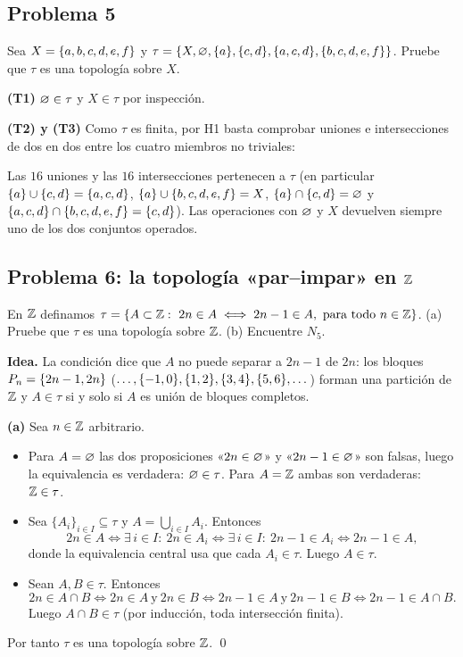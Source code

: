 \subsection{Problema 5}
\begin{enunciado}
Sea $X=\{a,b,c,d,e,f\}$ y $\tau=\{X,\varnothing,\{a\},\{c,d\},\{a,c,d\},\{b,c,d,e,f\}\}$. Pruebe que $\tau$ es una topología
sobre $X$.
\end{enunciado}
\textbf{(T1)} $\varnothing\in\tau$ y $X\in\tau$ por inspección.

\textbf{(T2) y (T3)} Como $\tau$ es finita, por H1 basta comprobar uniones e intersecciones de dos en dos entre los
cuatro miembros no triviales:
\begin{center}{\small\renewcommand{\arraystretch}{1.15}}\end{center}
\begin{center}{\small\renewcommand{\arraystretch}{1.15}}\end{center}
Las $16$ uniones y las $16$ intersecciones pertenecen a $\tau$ (en particular $\{a\}\cup\{c,d\}=\{a,c,d\}$,
$\{a\}\cup\{b,c,d,e,f\}=X$, $\{a\}\cap\{c,d\}=\varnothing$ y $\{a,c,d\}\cap\{b,c,d,e,f\}=\{c,d\}$). Las operaciones con
$\varnothing$ y $X$ devuelven siempre uno de los dos conjuntos operados.

\subsection{Problema 6: la topología «par--impar» en \texorpdfstring{$\mathbb{Z}$}{Z}}
\begin{enunciado}
En $\mathbb{Z}$ definamos $\tau=\{A\subset\Z:\ 2n\in A\iff 2n-1\in A,\ \text{para todo } n\in\Z\}$.
(a) Pruebe que $\tau$ es una topología sobre $\mathbb{Z}$. (b) Encuentre $N_5$.
\end{enunciado}
\textbf{Idea.} La condición dice que $A$ no puede separar a $2n-1$ de $2n$: los bloques
$P_n=\{2n-1,2n\}$ ($\dots,\{-1,0\},\{1,2\},\{3,4\},\{5,6\},\dots$) forman una partición de $\mathbb{Z}$ y
$A\in\tau$ si y solo si $A$ es unión de bloques completos.

\textbf{(a)} Sea $n\in\mathbb{Z}$ arbitrario.
\begin{itemize}
\item[(T1)] Para $A=\varnothing$ las dos proposiciones «$2n\in\varnothing$» y «$2n-1\in\varnothing$» son falsas, luego la equivalencia es
verdadera: $\varnothing\in\tau$. Para $A=\mathbb{Z}$ ambas son verdaderas: $\mathbb{Z}\in\tau$.
\item[(T2)] Sea $\{A_i\}_{i\in I}\subseteq\tau$ y $A=\bigcup_{i\in I}A_i$. Entonces
\[
2n\in A\iff \exists\, i\in I:\ 2n\in A_i\iff \exists\, i\in I:\ 2n-1\in A_i\iff 2n-1\in A,
\]
donde la equivalencia central usa que cada $A_i\in\tau$. Luego $A\in\tau$.
\item[(T3)] Sean $A,B\in\tau$. Entonces
\[
2n\in A\cap B\iff 2n\in A\ \text{y}\ 2n\in B\iff 2n-1\in A\ \text{y}\ 2n-1\in B\iff 2n-1\in A\cap B .
\]
Luego $A\cap B\in\tau$ (por inducción, toda intersección finita).
\end{itemize}
Por tanto $\tau$ es una topología sobre $\mathbb{Z}$. \qed


